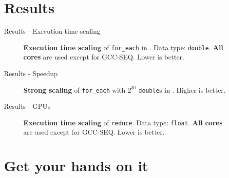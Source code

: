 \documentclass[aspectratio=169]{beamer}
\begin{document}
\section*{Results}

\begin{frame}{Results - Execution time scaling}
	\begin{figure}
		\begin{columns}
			
			
		\end{columns}
		\caption*{\textbf{Execution time scaling} of \texttt{for\_each} in \machvsclong. Data type: \texttt{double}. \textbf{All cores} are used except for GCC-SEQ. Lower is better.}
	\end{figure}
\end{frame}

\begin{frame}{Results - Speedup}
	\begin{figure}
		\begin{columns}
			\column{0.5\textwidth}
			
			\column{0.5\textwidth}
			
		\end{columns}
		\caption*{\textbf{Strong scaling} of \texttt{for\_each} with $2^{30}$ \texttt{double}s in \machvsclong. Higher is better.}
	\end{figure}
\end{frame}

\begin{frame}{Results - GPUs}
	\begin{figure}
		\begin{columns}
			
			
		\end{columns}
		\caption*{\textbf{Execution time scaling} of \texttt{reduce}. Data type: \texttt{float}. \textbf{All cores} are used except for GCC-SEQ. Lower is better.}
	\end{figure}
\end{frame}

\section*{Get your hands on it}
\end{document}
